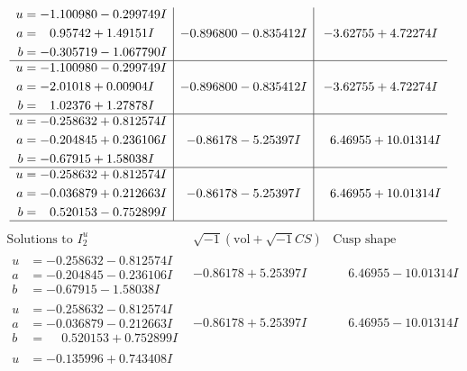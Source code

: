 \documentclass[1p]{elsarticle_modified}
\theoremstyle{definition}
\newcommand{\I}{\sqrt{-1}}
\begin{document}
$$\begin{array}{c|c|c}
\begin{aligned}
u &= -1.100980 - 0.299749 I \\
a &= \phantom{-}0.95742 + 1.49151 I \\
b &= -0.305719 - 1.067790 I\end{aligned}
 & -0.896800 - 0.835412 I & -3.62755 + 4.72274 I \\ \hline\begin{aligned}
u &= -1.100980 - 0.299749 I \\
a &= -2.01018 + 0.00904 I \\
b &= \phantom{-}1.02376 + 1.27878 I\end{aligned}
 & -0.896800 - 0.835412 I & -3.62755 + 4.72274 I \\ \hline\begin{aligned}
u &= -0.258632 + 0.812574 I \\
a &= -0.204845 + 0.236106 I \\
b &= -0.67915 + 1.58038 I\end{aligned}
 & -0.86178 - 5.25397 I & \phantom{-}6.46955 + 10.01314 I \\ \hline\begin{aligned}
u &= -0.258632 + 0.812574 I \\
a &= -0.036879 + 0.212663 I \\
b &= \phantom{-}0.520153 - 0.752899 I\end{aligned}
 & -0.86178 - 5.25397 I & \phantom{-}6.46955 + 10.01314 I\\
 \hline 
 \end{array}$$\newpage$$\begin{array}{c|c|c}  
\text{Solutions to }I^u_{2}& \I (\text{vol} + \sqrt{-1}CS) & \text{Cusp shape}\\
 \hline 
\begin{aligned}
u &= -0.258632 - 0.812574 I \\
a &= -0.204845 - 0.236106 I \\
b &= -0.67915 - 1.58038 I\end{aligned}
 & -0.86178 + 5.25397 I & \phantom{-}6.46955 - 10.01314 I \\ \hline\begin{aligned}
u &= -0.258632 - 0.812574 I \\
a &= -0.036879 - 0.212663 I \\
b &= \phantom{-}0.520153 + 0.752899 I\end{aligned}
 & -0.86178 + 5.25397 I & \phantom{-}6.46955 - 10.01314 I \\ \hline\begin{aligned}
u &= -0.135996 + 0.743408 I \\

\end{aligned}
\end{array}$$
\end{document}
